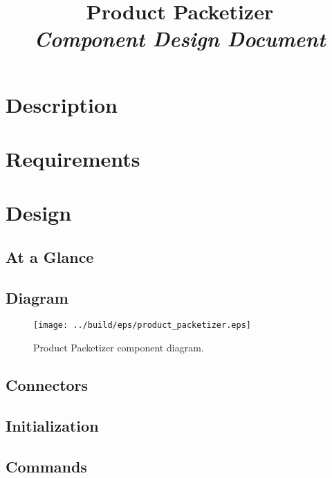 



\title{\textbf{Product Packetizer} \\
\large\textit{Component Design Document}}
\date{}
\maketitle

\section{Description}


\section{Requirements}


\section{Design}

\subsection{At a Glance}


\subsection{Diagram}
\begin{figure}[H]
  \texttt{[image: ../build/eps/product\_packetizer.eps]}
  \caption{Product Packetizer component diagram.}
\end{figure}

\subsection{Connectors}


\subsection{Initialization}


\subsection{Commands}

